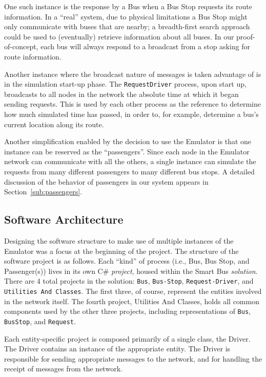 \documentclass[runningheads]{llncs}
\begin{document}
One such instance is the response by a Bus when a Bus Stop requests its route information. In a ``real'' system, due to physical limitations a Bus Stop might only communicate with buses that are nearby; a breadth-first search approach could be used to (eventually) retrieve information about all buses. In our proof-of-concept, each bus will always respond to a broadcast from a stop asking for route information.

Another instance where the broadcast nature of messages is taken advantage of is in the simulation start-up phase. The \lstinline{RequestDriver} process, upon start up, broadcasts to all nodes in the network the absolute time at which it began sending requests. This is used by each other process as the reference to determine how much simulated time has passed, in order to, for example, determine a bus's current location along its route.

Another simplification enabled by the decision to use the Emulator is that one instance can be reserved as the ``passengers''. Since each node in the Emulator network can communicate with all the others, a single instance can simulate the requests from many different passengers to many different bus stops. A detailed discussion of the behavior of passengers in our system appears in Section~\ref{sub:passengers}.

\subsection{Software Architecture}
Designing the software structure to make use of multiple instances of the Emulator was a focus at the beginning of the project. The structure of the software project is as follows. Each ``kind'' of process (i.e., Bus, Bus Stop, and Passenger(s)) lives in its own C\# \emph{project}, housed within the Smart Bus \emph{solution}. There are 4 total projects in the solution: \lstinline{Bus}, \lstinline{Bus-Stop}, \lstinline{Request-Driver}, and \lstinline{Utilities And Classes}. The first three, of course, represent the entities involved in the network itself. The fourth project, Utilities And Classes, holds all common components used by the other three projects, including representations of \lstinline{Bus}, \lstinline{BusStop}, and \lstinline{Request}.

Each entity-specific project is composed primarily of a single class, the Driver. The Driver contains an instance of the appropriate entity. The Driver is responsible for sending appropriate messages to the network, and for handling the receipt of messages from the network.
\end{document}
